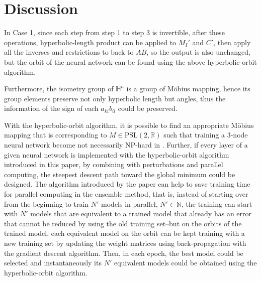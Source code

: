\documentclass{article}
\theoremstyle{plain}
\theoremstyle{plain} %
\theoremstyle{definition}  %
\theoremstyle{remark}  %
\theoremstyle{plain}
\begin{document}




\section{Discussion}
In Case 1, since each step from step 1 to step 3 is invertible, after these operations, hyperbolic-length product can be applied to $M_I'$ and $C'$, then apply all the inverses and restrictions to back to $AB$, so the output is also unchanged, but the orbit of the neural network can be found using the above hyperbolic-orbit algorithm.

Furthermore, the isometry group of $\mathbb{H}^n$ is a group of M\"{o}bius mapping, hence its group elements preserve not only hyperbolic length but angles, thus the information of the sign of each $a_{ki}b_{il}$ could be preserved.

With the hyperbolic-orbit algorithm, it is possible to find an appropriate M\"{o}bius mapping that is corresponding to $M\in\text{PSL}(2,\mathbb{R})$ such that training a 3-node neural network become not necessarily NP-hard in \cite{blum1988training}. Further, if every layer of a given neural network is implemented with the hyperbolic-orbit algorithm introduced in this paper, by combining with perturbations and parallel computing, the steepest descent path toward the global minimum could be designed. The algorithm introduced by the paper can help to save training time for parallel computing in the ensemble method, that is, instead of starting over from the beginning to train $N'$ models in parallel, $N'\in\mathbb{N}$, the training can start with $N'$ models that are equivalent to a trained model that already has an error that cannot be reduced by using the old training set--but on the orbits of the trained model, each equivalent model on the orbit can be kept training with a new training set by updating the weight matrices using back-propagation with the gradient descent algorithm. Then, in each epoch, the best model could be selected and instantaneously its $N'$ equivalent models could be obtained using the hyperbolic-orbit algorithm.
\end{document}
